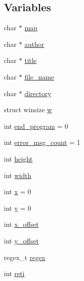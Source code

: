 \subsection*{Variables}
\begin{DoxyCompactItemize}
\item 
char $\ast$ \hyperlink{pacman-level-editor_8c_a7b00b1bfd666e26484471bd17a74eaa9}{map}
\item 
char $\ast$ \hyperlink{pacman-level-editor_8c_a70d51dcba75e5d70d4708c7885550468}{author}
\item 
char $\ast$ \hyperlink{pacman-level-editor_8c_af06d911bb9e05f491ef3da520d03796c}{title}
\item 
char $\ast$ \hyperlink{pacman-level-editor_8c_a8505c513bc640d1f69e5f76fb32b24a8}{file\-\_\-name}
\item 
char $\ast$ \hyperlink{pacman-level-editor_8c_a8eadc6730ef4fbdae87a20414b789faf}{directory}
\item 
struct winsize \hyperlink{pacman-level-editor_8c_a114d2a5a196322c42d4cd57cccb1f43b}{w}
\item 
int \hyperlink{pacman-level-editor_8c_a1bee207ff2415ab72a1e22c86a93f100}{end\-\_\-program} = 0
\item 
int \hyperlink{pacman-level-editor_8c_ae0ebb9a2dde9db7a8070d03799386e18}{error\-\_\-msg\-\_\-count} = 1
\item 
int \hyperlink{pacman-level-editor_8c_ad12fc34ce789bce6c8a05d8a17138534}{height}
\item 
int \hyperlink{pacman-level-editor_8c_a2474a5474cbff19523a51eb1de01cda4}{width}
\item 
int \hyperlink{pacman-level-editor_8c_a6150e0515f7202e2fb518f7206ed97dc}{x} = 0
\item 
int \hyperlink{pacman-level-editor_8c_a0a2f84ed7838f07779ae24c5a9086d33}{y} = 0
\item 
int \hyperlink{pacman-level-editor_8c_a87147769c08c4f0fef7b0ec6077b338d}{x\-\_\-offset}
\item 
int \hyperlink{pacman-level-editor_8c_abaa275d8b2c76fd77dd271402a4425d3}{y\-\_\-offset}
\item 
regex\-\_\-t \hyperlink{pacman-level-editor_8c_a0f8fc8b8cd2ff33a04952c702504ccf4}{regex}
\item 
int \hyperlink{pacman-level-editor_8c_aefa902538b1cd5840102ccc807fe3f37}{reti}
\end{DoxyCompactItemize}


